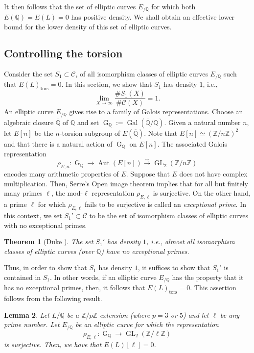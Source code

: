 \documentclass[12pt]{amsart}
\newtheorem{theorem}{Theorem}[section]
\newtheorem{lemma}[theorem]{Lemma}
\newcommand{\Z}{\mathbb{Z}}
\newcommand{\Q}{\mathbb{Q}}
\newcommand{\cC}{\mathcal{C}}
\newcommand{\op}[1]{\operatorname{#1}}
\numberwithin{equation}{section}
\begin{document}
It then follows that the set of elliptic curves $E_{/\Q}$ for which both $E(\Q)=E(L)=0$ has positive density. We shall obtain an effective lower bound for the lower density of this set of elliptic curves.

\subsection{Controlling the torsion}
\par Consider the set $S_1\subset \cC$, of all isomorphism classes of elliptic curves $E_{/\Q}$ such that $E(L)_{\op{tors}}=0$. In this section, we show that $S_1$ has density $1$, i.e., 
\[\lim_{X\rightarrow\infty} \frac{\#S_1(X)}{\# \cC(X)}=1.\]An elliptic curve $E_{/\Q}$ gives rise to a family of Galois representations. Choose an algebraic closure $\overline{\Q}$ of $\Q$ and set $\op{G}_{\Q}:=\op{Gal}(\overline{\Q}/\Q)$. Given a natural number $n$, let $E[n]$ be the $n$-torsion subgroup of $E(\overline{\Q})$. Note that $E[n]\simeq \left(\Z/n\Z\right)^2$ and that there is a natural action of $\op{G}_{\Q}$ on $E[n]$. The associated Galois representation 
\[\rho_{E,n} : \op{G}_{\Q}\rightarrow \op{Aut}(E[n])\xrightarrow{\sim}\op{GL}_2(\Z/n\Z) \]
encodes many arithmetic properties of $E$. Suppose that $E$ does not have complex multiplication. Then, Serre's Open image theorem implies that for all but finitely many primes $\ell$, the mod-$\ell$ representation $\rho_{E, \ell}$ is surjective. On the other hand, a prime $\ell$ for which $\rho_{E, \ell}$ fails to be surjective is called an \emph{exceptional prime}. In this context, we set $S_1'\subset \cC$ to be the set of isomorphism classes of elliptic curves with no exceptional primes. 

\begin{theorem}[Duke \cite{dukeexceptional}]\label{Duke}
    The set $S_1'$ has density $1$, i.e., almost all isomorphism classes of elliptic curves (over $\Q$) have no exceptional primes. 
\end{theorem}

Thus, in order to show that $S_1$ has density $1$, it suffices to show that $S_1'$ is contained in $S_1$. In other words, if an elliptic curve $E_{/\Q}$ has the property that it has no exceptional primes, then, it follows that $E(L)_{\op{tors}}=0$. This assertion follows from the following result. 

\begin{lemma}\label{rho surj implies 0 torsion}
    Let $L/\Q$ be a $\Z/p\Z$-extension (where $p=3$ or $5$) and let $\ell$ be any prime number. Let $E_{/\Q}$ be an elliptic curve for which the representation \[\rho_{E,\ell}: \op{G}_{\Q}\rightarrow \op{GL}_2(\Z/\ell \Z)\] is surjective. Then, we have that $E(L)[\ell]=0$.
\end{lemma}
\end{document}
